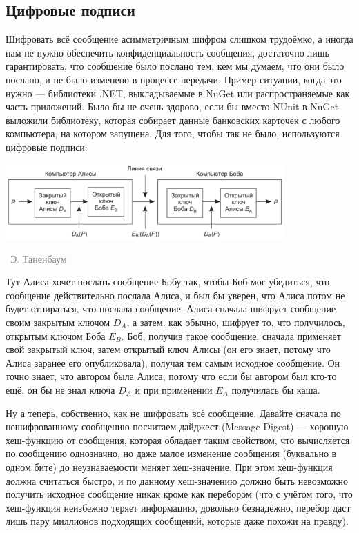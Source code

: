 \documentclass[a5paper]{article}
\newcommand{\attribution}[1] {
\vspace{-5mm}\begin{flushright}\begin{scriptsize}\textcolor{gray}{\textcopyright\, #1}\end{scriptsize}\end{flushright}
}
\begin{document}
\subsection{Цифровые подписи}

Шифровать всё сообщение асимметричным шифром слишком трудоёмко, а иногда нам не нужно обеспечить конфиденциальность сообщения, достаточно лишь гарантировать, что сообщение было послано тем, кем мы думаем, что они было послано, и не было изменено в процессе передачи. Пример ситуации, когда это нужно --- библиотеки .NET, выкладываемые в NuGet или распространяемые как часть приложений. Было бы не очень здорово, если бы вместо NUnit в NuGet выложили библиотеку, которая собирает данные банковских карточек с любого компьютера, на котором запущена. Для того, чтобы так не было, используются цифровые подписи:

\begin{center}
    \includegraphics[width=0.8\textwidth]{signature.png}
    \attribution{Э. Таненбаум}
\end{center}

Тут Алиса хочет послать сообщение Бобу так, чтобы Боб мог убедиться, что сообщение действительно послала Алиса, и был бы уверен, что Алиса потом не будет отпираться, что послала сообщение. Алиса сначала шифрует сообщение своим закрытым ключом $D_A$, а затем, как обычно, шифрует то, что получилось, открытым ключом Боба $E_B$. Боб, получив такое сообщение, сначала применяет свой закрытый ключ, затем открытый ключ Алисы (он его знает, потому что Алиса заранее его опубликовала), получая тем самым исходное сообщение. Он точно знает, что автором была Алиса, потому что если бы автором был кто-то ещё, он бы не знал ключа $D_A$ и при применении $E_A$ получилась бы каша.

Ну а теперь, собственно, как не шифровать всё сообщение. Давайте сначала по нешифрованному сообщению посчитаем дайджест (Message Digest) --- хорошую хеш-функцию от сообщения, которая обладает таким свойством, что вычисляется по сообщению однозначно, но даже малое изменение сообщения (буквально в одном бите) до неузнаваемости меняет хеш-значение. При этом хеш-функция должна считаться быстро, и по данному хеш-значению должно быть невозможно получить исходное сообщение никак кроме как перебором (что с учётом того, что хеш-функция неизбежно теряет информацию, довольно безнадёжно, перебор даст лишь пару миллионов подходящих сообщений, которые даже похожи на правду). 
\end{document}
